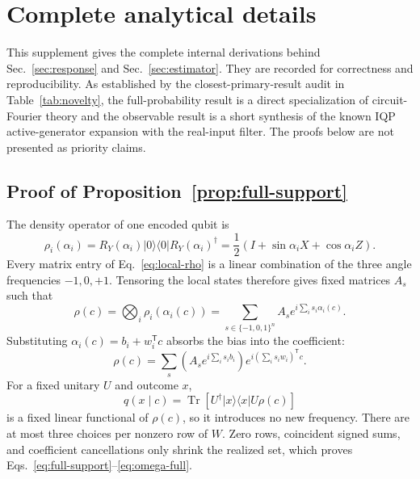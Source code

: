 \section{Complete analytical details}
\label{app:proofs}

This supplement gives the complete internal derivations behind
Sec.~\ref{sec:response} and Sec.~\ref{sec:estimator}.  They are recorded for
correctness and reproducibility.  As established by the closest-primary-result
audit in Table~\ref{tab:novelty}, the full-probability result is a direct
specialization of circuit-Fourier theory and the observable result is a short
synthesis of the known IQP active-generator expansion with the real-input
filter.  The proofs below are not presented as priority claims.

\subsection{Proof of Proposition~\ref{prop:full-support}}

The density operator of one encoded qubit is
\begin{equation}
 \rho_i(\alpha_i)=R_Y(\alpha_i)|0\rangle\!\langle0|R_Y(\alpha_i)^\dagger
 =\frac12\left(I+\sin\alpha_iX+\cos\alpha_iZ\right).
 \label{eq:local-rho}
\end{equation}
Every matrix entry of Eq.~\eqref{eq:local-rho} is a linear combination of the
three angle frequencies $-1,0,+1$.  Tensoring the local states therefore gives
fixed matrices $A_s$ such that
\begin{equation}
 \rho(c)=\bigotimes_i\rho_i(\alpha_i(c))
 =\sum_{s\in\{-1,0,1\}^n}A_s
 e^{i\sum_i s_i\alpha_i(c)}.
\end{equation}
Substituting $\alpha_i(c)=b_i+w_i^\mathsf{T}c$ absorbs the bias into the
coefficient:
\begin{equation}
 \rho(c)=\sum_s\left(A_se^{i\sum_i s_ib_i}\right)
 e^{i(\sum_i s_iw_i)^\mathsf{T}c}.
\end{equation}
For a fixed unitary $U$ and outcome $x$,
\begin{equation}
 q(x\mid c)=\operatorname{Tr}\!\left[
 U^\dagger|x\rangle\!\langle x|U\rho(c)\right]
\end{equation}
is a fixed linear functional of $\rho(c)$, so it introduces no new frequency.
There are at most three choices per nonzero row of $W$.  Zero rows, coincident
signed sums, and coefficient cancellations only shrink the realized set,
which proves Eqs.~\eqref{eq:full-support}--\eqref{eq:omega-full}.

